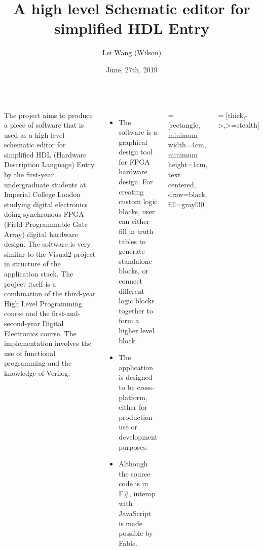 \documentclass[12pt, a1paper, landscape]{tikzposter}
\title{A high level Schematic editor for simplified HDL Entry}
\author{Lei Wang (Wilson)}
\date{June, 27th, 2019}
\institute{Imperial College London}
\begin{document}
 
\maketitle

\begin{columns}
    {The project aims to produce a piece of software that is used as a high level schematic editor for simplified HDL (Hardware Description Language) Entry by the first-year undergraduate students at Imperial College London studying digital electronics doing synchronous FPGA (Field Programmable Gate Array) digital hardware design. The software is very similar to the Visual2 project in structure of the application stack. The project itself is a combination of the third-year High Level Programming course and the first-and-second-year Digital Electronics course. The implementation involves the use of functional programming and the knowledge of Verilog.}
    
    {
    
\begin{itemize}
    \item The software is a graphical design tool for FPGA hardware design. For creating custom logic blocks, user can either fill in truth tables to generate standalone blocks, or connect different logic blocks together to form a higher level block.
    \item The application is designed to be cross-platform, either for production use or development purposes.
    \item Although the source code is in F\#, interop with JavaScript is made possible by Fable.
\end{itemize}
    }
    
    {
 = [rectangle, minimum width=4cm, minimum height=1cm, text centered, draw=black, fill=gray!30]

 = [thick,->,>=stealth]

}
\end{columns}
\end{document}
